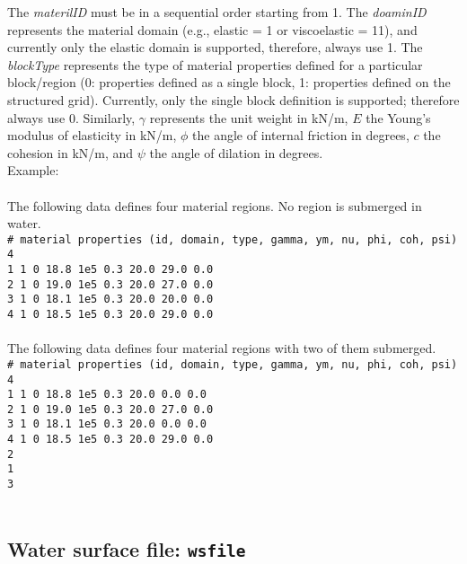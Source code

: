 The \emph{materilID} must be in a sequential order starting from 1. The \emph{doaminID} represents the material domain (e.g., elastic = 1 or viscoelastic = 11), and currently only the elastic domain is supported, therefore, always use 1. The \emph{blockType} represents the type of material properties defined for a particular block/region (0: properties defined as a single block, 1: properties defined on the structured grid). Currently, only the single block definition is supported; therefore always use 0.  Similarly, $\gamma$ represents the unit weight in kN/m, $E$ the Young's modulus of elasticity in kN/m, $\phi$ the angle of internal friction in degrees, $c$ the cohesion in kN/m, and $\psi$ the angle of dilation in degrees.\\

Example:\\
\\
The following data defines four material regions. No region is submerged in water.\\

\texttt{\# material properties (id, domain, type, gamma, ym, nu, phi, coh, psi)\\
4\\
1 1 0 18.8 1e5 0.3 20.0 29.0 0.0\\
2 1 0 19.0 1e5 0.3 20.0 27.0 0.0\\
3 1 0 18.1 1e5 0.3 20.0 20.0 0.0\\
4 1 0 18.5 1e5 0.3 20.0 29.0 0.0\\
}\\

The following data defines four material regions with two of them submerged.\\

\texttt{\# material properties (id, domain, type, gamma, ym, nu, phi, coh, psi)\\
4\\
1 1 0 18.8 1e5 0.3 20.0 0.0 0.0\\
2 1 0 19.0 1e5 0.3 20.0 27.0 0.0\\
3 1 0 18.1 1e5 0.3 20.0 0.0 0.0\\
4 1 0 18.5 1e5 0.3 20.0 29.0 0.0\\
2\\
1\\
3\\
}\\


\subsection{Water surface file: \texttt{wsfile}}

